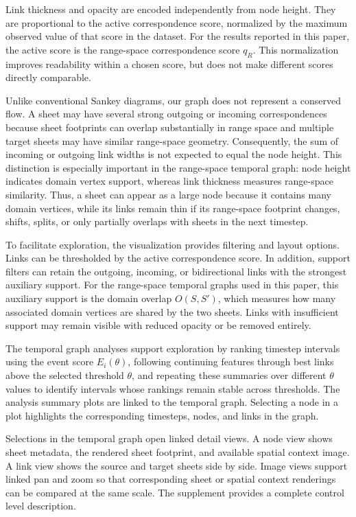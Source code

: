 \documentclass[review]{vgtc}                          %
\newcommand{\Sheet}{S}
\begin{document}
Link thickness and opacity are encoded independently from node height. They are proportional to the active correspondence score, normalized by the maximum observed value of that score in the dataset. For the results reported in this paper, the active score is the range-space correspondence score $q_R$. This normalization improves readability within a chosen score, but does not make different scores directly comparable.

Unlike conventional Sankey diagrams, our graph does not represent a conserved flow. A sheet may have several strong outgoing or incoming correspondences because sheet footprints can overlap substantially in range space and multiple target sheets may have similar range-space geometry. Consequently, the sum of incoming or outgoing link widths is not expected to equal the node height. This distinction is especially important in the range-space temporal graph: node height indicates domain vertex support, whereas link thickness measures range-space similarity. Thus, a sheet can appear as a large node because it contains many domain vertices, while its links remain thin if its range-space footprint changes, shifts, splits, or only partially overlaps with sheets in the next timestep.

To facilitate exploration, the visualization provides filtering and layout options. Links can be thresholded by the active correspondence score. In addition, support filters can retain the outgoing, incoming, or bidirectional links with the strongest auxiliary support. For the range-space temporal graphs used in this paper, this auxiliary support is the domain overlap $O(\Sheet,\Sheet')$, which measures how many associated domain vertices are shared by the two sheets. Links with insufficient support may remain visible with reduced opacity or be removed entirely.

The temporal graph analyses support exploration by ranking timestep intervals using the event score $E_i(\theta)$, following continuing features through best links above the selected threshold $\theta$, and repeating these summaries over different $\theta$ values to identify intervals whose rankings remain stable across thresholds. The analysis summary plots are linked to the temporal graph. Selecting a node in a plot highlights the corresponding timesteps, nodes, and links in the graph.

Selections in the temporal graph open linked detail views. A node view shows sheet metadata, the rendered sheet footprint, and available spatial context image. A link view shows the source and target sheets side by side. Image views support linked pan and zoom so that corresponding sheet or spatial context renderings can be compared at the same scale. The supplement provides a complete control level description.
\end{document}
